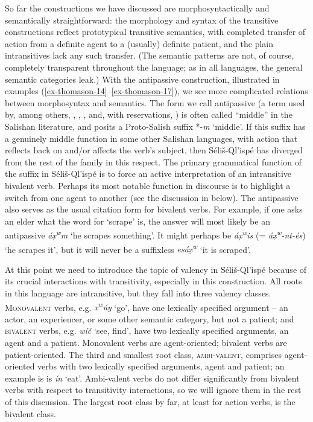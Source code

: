\documentclass[output=paper,colorlinks,citecolor=brown]{langscibook}
\begin{document}
So far the constructions we have discussed are morphosyntactically and
semantically straightforward: the morphology and syntax of the
transitive constructions reflect prototypical transitive semantics,
with completed transfer of action from a definite agent to a (usually)
definite patient, and the plain intransitives lack any such transfer.
(The semantic patterns are not, of course, completely transparent
throughout the language; as in all languages, the general semantic
categories leak.)  With the antipassive construction, illustrated in
examples (\ref{ex-thomason-14}--\ref{ex-thomason-17}), we see more complicated relations between morphosyntax and
semantics.  The form we call antipassive (a term used by, among
others, \citet[31]{Kroeber:1999}, \citet{Darnell:1990}, \citet{Gerdts:1993}, and,
with reservations, \citet[102]{Thompson&Thompson:1992}) is often
called “middle” in the Salishan literature, and \citet[158]{Newman:1980}
posits a Proto-Salish suffix *-\emph{m} `middle'.  If this suffix has a
genuinely middle function in some other Salishan languages, with
action that reflects back on and/or affects the verb's subject, then
S\'eli\v{s}-Ql'isp\'e has diverged from the rest of the family in this
respect.  The primary grammatical function of the suffix in
S\'eli\v{s}-Ql'isp\'e is to force an active interpretation of an
intransitive bivalent verb.  Perhaps its most notable function in
discourse is to highlight a switch from one agent to another (see the
discussion in  below).  The antipassive also serves as the usual
citation form for bivalent verbs.  For example, if one asks an elder
what the word for `scrape' is, the answer will most likely be an
antipassive \emph{\textglotstop\'a{\d{x}\textsuperscript w}m} `he
scrapes something'.  It might perhaps be \emph{\textglotstop\'a{\d{x}\textsuperscript w}is} (= \emph{\textglotstop\'a{\d{x}\textsuperscript w}-nt-\'es}) `he scrapes it',
but it will never be a suffixless \emph{es\textglotstop\'a\d{x}\textsuperscript w} `it is scraped'.

At this point we need to introduce the topic of valency in
S\'eli\v{s}-Ql'isp\'e because of its crucial interactions with
transitivity, especially in this construction.  All roots in this
language are intransitive, but they fall into three valency
classes. \textsc{Monovalent} verbs, e.g. \emph{x\textsuperscript w\'uy}
`go', have one lexically specified argument -- an actor, an
experiencer, or some other semantic category, but not a patient; and
\textsc{bivalent} verbs, e.g. \emph{w\'i\v{c}} `see, find', have two
lexically specified arguments, an agent and a patient.  Monovalent
verbs are agent-oriented; bivalent verbs are patient-oriented.  The
third and smallest root class, \textsc{ambi-valent}, comprises
agent\hyp oriented verbs with two lexically specified arguments, agent and
patient; an example is is \emph{\textglotstop\'i{\textltilde}n} `eat'.
Ambi-valent verbs do not differ significantly from bivalent verbs with
respect to transitivity interactions, so we will ignore them in the
rest of this discussion.  The largest root class by far, at least for
action verbs, is the bivalent class.
\end{document}
